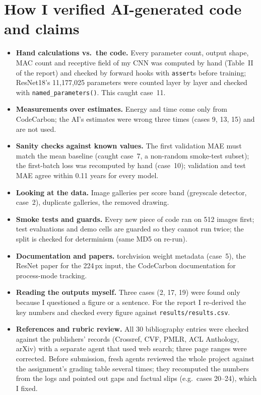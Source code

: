 \documentclass[10pt,a4paper]{article}
\begin{document}
\section{How I verified AI-generated code and claims}
\begin{itemize}
\item \textbf{Hand calculations vs.\ the code.} Every parameter count, output shape, MAC count and receptive field of my CNN was computed by hand (Table~II of the report) and checked by forward hooks with \texttt{assert}s before training; ResNet18's 11{,}177{,}025 parameters were counted layer by layer and checked with \texttt{named\_parameters()}. This caught case~11.
\item \textbf{Measurements over estimates.} Energy and time come only from CodeCarbon; the AI's estimates were wrong three times (cases 9, 13, 15) and are not used.
\item \textbf{Sanity checks against known values.} The first validation MAE must match the mean baseline (caught case~7, a non-random smoke-test subset); the first-batch loss was recomputed by hand (case~10); validation and test MAE agree within 0.11 years for every model.
\item \textbf{Looking at the data.} Image galleries per score band (greyscale detector, case~2), duplicate galleries, the removed drawing.
\item \textbf{Smoke tests and guards.} Every new piece of code ran on 512 images first; test evaluations and demo cells are guarded so they cannot run twice; the split is checked for determinism (same MD5 on re-run).
\item \textbf{Documentation and papers.} torchvision weight metadata (case~5), the ResNet paper for the 224\,px input, the CodeCarbon documentation for process-mode tracking.
\item \textbf{Reading the outputs myself.} Three cases (2, 17, 19) were found only because I questioned a figure or a sentence. For the report I re-derived the key numbers and checked every figure against \texttt{results/results.csv}.
\item \textbf{References and rubric review.} All 30 bibliography entries were checked against the publishers' records (Crossref, CVF, PMLR, ACL Anthology, arXiv) with a separate agent that used web search; three page ranges were corrected. Before submission, fresh agents reviewed the whole project against the assignment's grading table several times; they recomputed the numbers from the logs and pointed out gaps and factual slips (e.g.\ cases 20--24), which I fixed.
\end{itemize}
\end{document}
